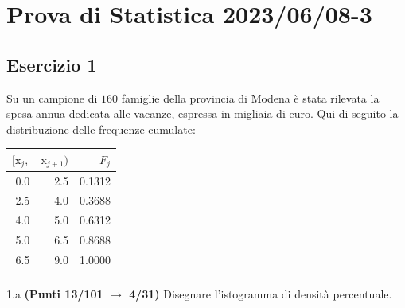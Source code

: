 \documentclass[
  11pt,
]{book}
\theoremstyle{mytheoremstyle}
\theoremstyle{mydefstyle}
\begin{document}
\section{Prova di Statistica 2023/06/08-3}\label{prova-di-statistica-20230608-3}

\subsection{Esercizio 1}\label{esercizio-1-27}

Su un campione di \(160\) famiglie della provincia di Modena è stata rilevata la spesa annua dedicata alle vacanze, espressa in migliaia di euro. Qui di seguito la distribuzione delle frequenze cumulate:

\begin{table}[H]
\centering
\begin{tabular}{rrr}
\toprule
$[\text{x}_j,$ & $\text{x}_{j+1})$ & $F_j$\\
\midrule
0.0 & 2.5 & 0.1312\\
2.5 & 4.0 & 0.3688\\
4.0 & 5.0 & 0.6312\\
5.0 & 6.5 & 0.8688\\
6.5 & 9.0 & 1.0000\\
 &  & \\
\bottomrule
\end{tabular}
\end{table}

1.a \textbf{(Punti 13/101 \(\rightarrow\) 4/31)} Disegnare l'istogramma di densità percentuale.
\end{document}
